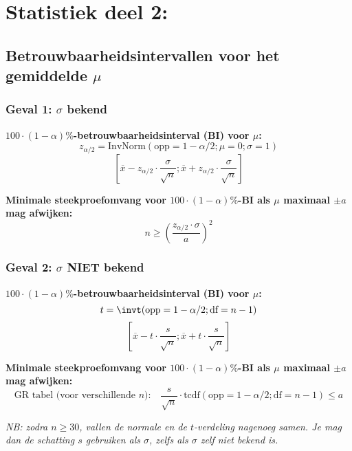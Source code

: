 \section*{Statistiek deel 2:}

\subsection*{Betrouwbaarheidsintervallen voor het gemiddelde $\mu$}
    \subsubsection*{Geval 1: $\sigma$ bekend}
        \textbf{\boldmath$100\cdot(1-\alpha)\%$-betrouwbaarheidsinterval (BI) voor \boldmath$\mu$:}
        \[
            z_{\alpha/2} = \text{InvNorm}(\text{opp}=1-\alpha/2; \mu=0; \sigma=1)
        \]
        \[
            [\overline{x} - z_{\alpha/2} \cdot \frac{\sigma}{\sqrt{n}}; \overline{x} + z_{\alpha/2} \cdot \frac{\sigma}{\sqrt{n}}]
        \]

        \textbf{Minimale steekproefomvang voor \boldmath$100\cdot(1-\alpha)\%$-BI als \boldmath$\mu$ maximaal \boldmath$\pm a$ mag afwijken:}
        \[
            n \ge \left( \frac{z_{\alpha/2} \cdot \sigma}{a} \right)^2
        \]

    \subsubsection*{Geval 2: $\sigma$ NIET bekend}
        \textbf{\boldmath$100\cdot(1-\alpha)\%$-betrouwbaarheidsinterval (BI) voor \boldmath$\mu$:}
        \[
            t = \invt(\text{opp}=1-\alpha/2; \text{df}=n-1)
        \]
        \[
            [\overline{x} - t \cdot \frac{s}{\sqrt{n}}; \overline{x} + t \cdot \frac{s}{\sqrt{n}}]
        \]

        \textbf{Minimale steekproefomvang voor $100\cdot(1-\alpha)\%$-BI als $\mu$ maximaal \boldmath$\pm a$ mag afwijken:}
        \[
            \text{GR tabel (voor verschillende $n$):} \quad \frac{s}{\sqrt{n}} \cdot \text{tcdf}(\text{opp}=1-\alpha/2; \text{df}=n-1) \le a
        \]
    
    {\itshape NB: zodra $n \ge 30$, vallen de normale en de $t$-verdeling nagenoeg samen. Je mag dan de schatting $s$ gebruiken als $\sigma$, zelfs als $\sigma$ zelf niet bekend is.}

